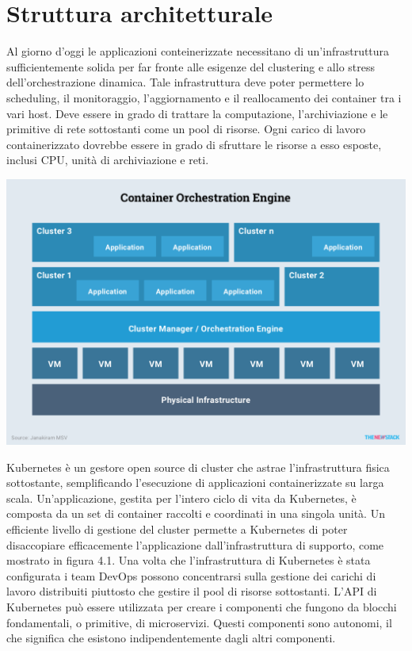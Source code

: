 \documentclass[12pt, a4paper]{report}
\begin{document}
\chapter{Struttura architetturale}
Al giorno d'oggi le applicazioni conteinerizzate necessitano di un'infrastruttura sufficientemente solida per far fronte alle esigenze del clustering e allo stress dell'orchestrazione dinamica. Tale infrastruttura deve poter permettere lo scheduling, il monitoraggio, l'aggiornamento e il reallocamento dei container tra i vari host. Deve essere in grado di trattare la computazione, l'archiviazione e le primitive di rete sottostanti come un pool di risorse. Ogni carico di lavoro containerizzato dovrebbe essere in grado di sfruttare le risorse a esso esposte, inclusi CPU, unità di archiviazione e reti.
\begin{center}
  \includegraphics[scale=0.4]{Images/Kubernetes-overview}
\end{center}
Kubernetes è un gestore open source di cluster che astrae l'infrastruttura fisica sottostante, semplificando l'esecuzione di applicazioni containerizzate su larga scala. Un'applicazione, gestita per l'intero ciclo di vita da Kubernetes, è composta da un set di container raccolti e coordinati in una singola unità. Un efficiente livello di gestione del cluster permette a Kubernetes di poter disaccopiare efficacemente l'applicazione dall'infrastruttura di supporto, come mostrato in figura 4.1. Una volta che l'infrastruttura di Kubernetes è stata configurata i team DevOps possono concentrarsi sulla gestione dei carichi di lavoro distribuiti piuttosto che gestire il pool di risorse sottostanti.
L'API di Kubernetes può essere utilizzata per creare i componenti che fungono da blocchi fondamentali, o primitive, di microservizi. Questi componenti sono autonomi, il che significa che esistono indipendentemente dagli altri componenti.
\end{document}
